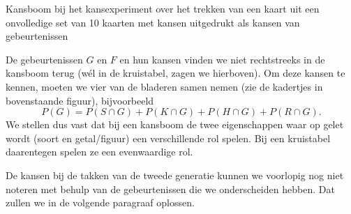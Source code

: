 \begin{multicols}{2}
\begin{afbeeldingenv}
\caption{Kansboom bij het kansexperiment over het trekken van een kaart uit een onvolledige set van 10 kaarten met kansen uitgedrukt als kansen van gebeurtenissen}
\label{fig:kansboom_kaartvb_verz}
\end{afbeeldingenv}

De gebeurtenissen $G$ en $F$ en hun kansen vinden we niet rechtstreeks in de kansboom terug (wél in de kruistabel, zagen we hierboven). Om deze kansen te kennen, moeten we vier van de bladeren samen nemen (zie de kadertjes in bovenstaande figuur), bijvoorbeeld
$$P(G)=P(S \cap G)+P(K \cap G)+P(H \cap G)+P(R \cap G).$$
We stellen dus vast dat bij een kansboom de twee eigenschappen waar op gelet wordt (soort en getal/figuur) een verschillende rol spelen. Bij een kruistabel daarentegen spelen ze een evenwaardige rol.

De kansen bij de takken van de tweede generatie kunnen we voorlopig nog niet noteren met behulp van de gebeurtenissen die we onderscheiden hebben. Dat zullen we in de volgende paragraaf oplossen.


\end{multicols}
